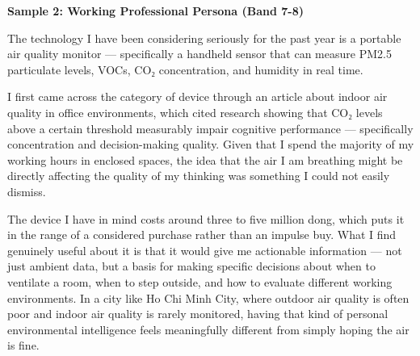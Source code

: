 \begin{ieltsanswer}
\textbf{Sample 2: Working Professional Persona (Band 7-8)}

The technology I have been considering seriously for the past year is a portable air quality monitor — specifically a handheld sensor that can measure PM2.5 particulate levels, VOCs, CO₂ concentration, and humidity in real time.

I first came across the category of device through an article about indoor air quality in office environments, which cited research showing that CO₂ levels above a certain threshold measurably impair cognitive performance — specifically concentration and decision-making quality. Given that I spend the majority of my working hours in enclosed spaces, the idea that the air I am breathing might be directly affecting the quality of my thinking was something I could not easily dismiss.

The device I have in mind costs around three to five million dong, which puts it in the range of a considered purchase rather than an impulse buy. What I find genuinely useful about it is that it would give me actionable information — not just ambient data, but a basis for making specific decisions about when to ventilate a room, when to step outside, and how to evaluate different working environments. In a city like Ho Chi Minh City, where outdoor air quality is often poor and indoor air quality is rarely monitored, having that kind of personal environmental intelligence feels meaningfully different from simply hoping the air is fine.
\end{ieltsanswer}


